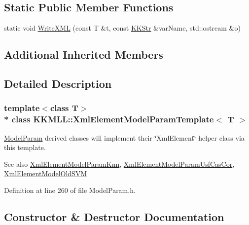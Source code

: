 \subsection*{Static Public Member Functions}
\begin{DoxyCompactItemize}
\item 
static void \hyperlink{class_k_k_m_l_l_1_1_xml_element_model_param_template_af457fcfd9a26b9993712371879c2d527}{Write\+X\+ML} (const T \&t, const \hyperlink{class_k_k_b_1_1_k_k_str}{K\+K\+Str} \&var\+Name, std\+::ostream \&o)
\end{DoxyCompactItemize}
\subsection*{Additional Inherited Members}


\subsection{Detailed Description}
\subsubsection*{template$<$class T$>$\\*
class K\+K\+M\+L\+L\+::\+Xml\+Element\+Model\+Param\+Template$<$ T $>$}

\hyperlink{class_k_k_m_l_l_1_1_model_param}{Model\+Param} derived classes will implement their \char`\"{}\+Xml\+Element\char`\"{} helper class via this template. 

\begin{DoxySeeAlso}{See also}
\hyperlink{namespace_k_k_m_l_l_af998b0f3ec84644bcd076fc2a31a8ec2}{Xml\+Element\+Model\+Param\+Knn}, \hyperlink{namespace_k_k_m_l_l_af9dabd65f5ed6cd055ba48c7780134b1}{Xml\+Element\+Model\+Param\+Usf\+Cas\+Cor}, \hyperlink{namespace_k_k_m_l_l_a7e90a26f4dcf446a8c305201aa2b4432}{Xml\+Element\+Model\+Old\+S\+VM} 
\end{DoxySeeAlso}


Definition at line 260 of file Model\+Param.\+h.



\subsection{Constructor \& Destructor Documentation}
